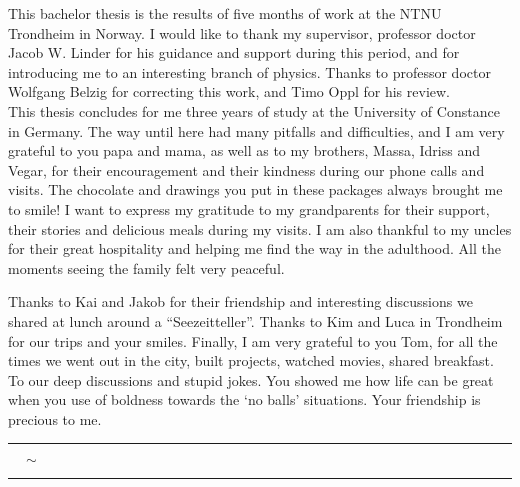 \documentclass[../main.tex]{subfile}
\begin{document}
This bachelor thesis is the results of five months of work at the NTNU Trondheim in Norway. I would like to thank my supervisor, professor doctor Jacob W. Linder
for his guidance and support during this period, and for introducing me to an interesting branch of physics. Thanks to professor doctor Wolfgang Belzig for 
correcting this work, and Timo Oppl for his review.\\

This thesis concludes for me three years of study at the University of Constance in Germany. The way until here had many pitfalls and difficulties, and I am very grateful to 
you papa and mama, as well as to my brothers, Massa, Idriss and Vegar, for their encouragement and their kindness during our phone calls and visits. The chocolate and drawings you put in these packages
always brought me to smile! I want to express my gratitude to my grandparents for their support, their stories and delicious meals during my visits. I am also thankful
to my uncles for their great hospitality and helping me find the way in the adulthood. All the moments seeing the family felt very peaceful.

Thanks to Kai and Jakob for their friendship and interesting discussions we shared at lunch around a ``Seezeitteller''. Thanks to Kim and Luca 
in Trondheim for our trips and your smiles. Finally, I am very grateful to you Tom, for all the times we went out in the city, built projects,
watched movies, shared breakfast.
To our deep discussions and stupid jokes. You showed me how life can be great when you use of boldness towards the `no balls' situations.
Your friendship is precious to me.

\begin{center}
    \rule{0.1\textwidth}{0.2pt} $\quad\sim\quad$\rule{0.1\textwidth}{0.2pt} 
\end{center}
\end{document}
